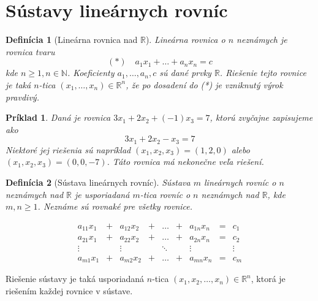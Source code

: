 \documentclass{article}
\newtheorem{definition}{Definícia}
\newtheorem{example}{Príklad}
\begin{document}
\section{Sústavy lineárnych rovníc}

\begin{definition}[Lineárna rovnica nad $\mathbb{R}$]
Lineárna rovnica o $n$ neznámych je rovnica tvaru
$$ (*) \quad a_{1}x_{1} + \dots + a_{n}x_{n} = c $$
kde $n \ge 1, n \in \mathbb{N}$. Koeficienty $a_1, \dots, a_n, c$ sú dané prvky $\mathbb{R}$. Riešenie tejto rovnice je taká $n$-tica $(x_1, \dots, x_n) \in \mathbb{R}^n$, že po dosadení do (*) je vzniknutý výrok pravdivý.
\end{definition}

\begin{example}
Daná je rovnica $3x_{1} + 2x_{2} + (-1)x_{3} = 7$, ktorú zvyčajne zapisujeme ako
$$ 3x_{1} + 2x_{2} - x_{3} = 7 $$
Niektoré jej riešenia sú napríklad $(x_{1}, x_{2}, x_{3}) = (1, 2, 0)$ alebo $(x_{1}, x_{2}, x_{3}) = (0, 0, -7)$. Táto rovnica má nekonečne veľa riešení.
\end{example}

\begin{definition}[Sústava lineárnych rovníc]
Sústava $m$ lineárnych rovníc o $n$ neznámych nad $\mathbb{R}$ je usporiadaná
$m$-tica rovníc o $n$ neznámych nad $\mathbb{R}$, kde $m, n \ge 1$. Neznáme sú
rovnaké pre všetky rovnice.
\end{definition}

\begin{equation}\label{eq:sustava}
\begin{array}{ccccccccc}
a_{11}x_{1} & + & a_{12}x_{2} & + & \dots & + & a_{1n}x_{n} & = & c_{1} \\
a_{21}x_{1} & + & a_{22}x_{2} & + & \dots & + & a_{2n}x_{n} & = & c_{2} \\
\vdots & & \vdots & & \ddots & & \vdots & & \vdots \\
a_{m1}x_{1} & + & a_{m2}x_{2} & + & \dots & + & a_{mn}x_{n} & = & c_{m}
\end{array}
\end{equation}

Riešenie sústavy je taká usporiadaná $n$-tica $(x_{1}, x_{2}, \dots, x_{n}) \in \mathbb{R}^{n}$, ktorá je riešením každej rovnice v sústave.
\end{document}
